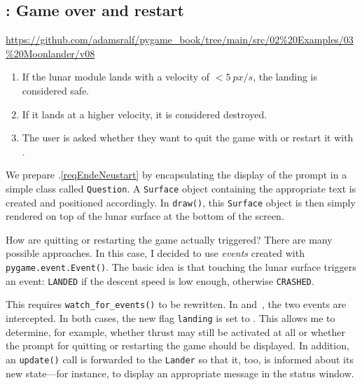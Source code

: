\newpage
\subsection{: Game over and restart}
\begin{diskbox}
	\url{https://github.com/adamsralf/pygame_book/tree/main/src/02%20Examples/03%20Moonlander/v08}
\end{diskbox}

\begin{enumerate}
	\item If the lunar module lands with a velocity of $<\SI{5}{px/s}$, the landing is considered safe.\label{reqEndeGewonnen}
	\item If it lands at a higher velocity, it is considered destroyed.\label{reqEndeVerloren}
	\item The user is asked whether they want to quit the game with  or restart it with .\label{reqEndeNeustart}
\end{enumerate}
\er

We prepare .\ref{reqEndeNeustart} by encapsulating the display of the prompt in a simple class called \texttt{Question}. A \texttt{Surface} object containing the appropriate text is created and positioned accordingly. In \texttt{draw()}, this \texttt{Surface} object is then simply rendered on top of the lunar surface at the bottom of the screen.


How are quitting or restarting the game actually triggered? There are many possible approaches. In this case, I decided to use \emph{events} created with \texttt{pygame.event.Event()}. The basic idea is that touching the lunar surface triggers an event: \texttt{LANDED} if the descent speed is low enough, otherwise \texttt{CRASHED}.


This requires \texttt{watch\_for\_events()} to be rewritten. In  and~, the two events are intercepted. In both cases, the new flag \texttt{landing} is set to \false{}. This allows me to determine, for example, whether thrust may still be activated at all or whether the prompt for quitting or restarting the game should be displayed. In addition, an \texttt{update()} call is forwarded to the \texttt{Lander} so that it, too, is informed about its new state—for instance, to display an appropriate message in the status window.

